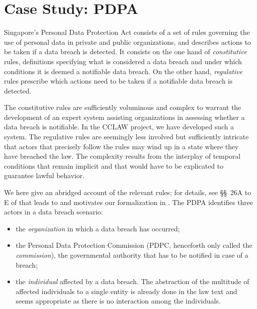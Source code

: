 \section{Case Study: PDPA}\label{sec:case_study_pdpa}

Singapore's Personal Data Protection Act \cite{pdpa_link} consists of a set of
rules governing the use of personal data in private and public organizations,
and describes actions to be taken if a data breach is detected. It consists on
the one hand of \emph{constitutive} rules, \ie{} definitions specifying
what is considered a data breach and under which conditions it is deemed a
notifiable data breach. On the other hand, \emph{regulative} rules prescribe
which actions need to be taken if a notifiable data breach is detected.

The constitutive rules are sufficiently voluminous and complex to warrant the
development of an expert system assisting organizations in assessing whether a
data breach is notifiable. In the CCLAW project, we have developed such a
system. The regulative rules
are seemingly less involved but sufficiently intricate that actors that
precisely follow the rules may wind up in a state where they have breached the
law. The complexity results from the interplay of temporal conditions that
remain implicit and that would have to be explicated to guarantee lawful
behavior.

We here give an abridged account of the relevant rules; for details, see
\S\S~26A to E of \cite{pdpa_link} that leads to and motivates our
formalization in . The PDPA identifies three
actors in a data breach scenario:
\begin{itemize}
\item the \emph{organization} in which a data breach has occurred;
\item the Personal Data Protection Commission (PDPC, henceforth only called
  the \emph{commission}), the governmental authority that has to be notified
  in case of a breach;
\item the \emph{individual} affected by a data breach. The abstraction of the
  multitude of affected individuals to a single entity is already done in the
  law text and seems appropriate as there is no interaction among the
  individuals. 
\end{itemize}

